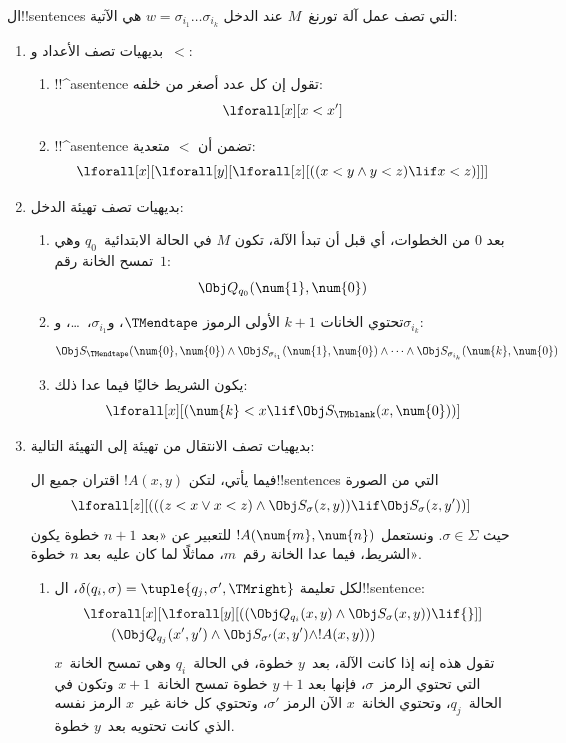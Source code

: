 \documentclass[../../../include/open-logic-section]{subfiles}
\begin{document}
ال!!{sentence}s التي تصف عمل آلة تورنغ~$M$ عند الدخل
$w=\sigma_{i_1}\dots\sigma_{i_k}$ هي الآتية:
\begin{enumerate}
\item بديهيات تصف الأعداد و~$<$:
\begin{enumerate}
\item !!^a{sentence} تقول إن كل عدد أصغر من خلفه:
\[
\lforall[x][x < x']
\]
\item !!^a{sentence} تضمن أن $<$ متعدية:
\[
\lforall[x][\lforall[y][\lforall[z][
      ((x < y \land y < z) \lif x < z)]]]
\]
\end{enumerate}
\item بديهيات تصف تهيئة الدخل:
\begin{enumerate}
\item بعد $0$ من الخطوات، أي قبل أن تبدأ الآلة، تكون $M$ في الحالة
  الابتدائية~$q_0$ وهي تمسح الخانة رقم~$1$:
\[
\Obj Q_{q_0}(\num{1},\num{0})
\]
\item تحتوي الخانات $k+1$ الأولى الرموز $\TMendtape$،
  و$\sigma_{i_1}$،~\dots، و$\sigma_{i_k}$:
\[
\Obj S_\TMendtape(\num{0}, \num{0}) \land
\Obj S_{\sigma_{i_1}}(\num{1}, \num{0}) \land
\dots \land
\Obj S_{\sigma_{i_k}}(\num{k}, \num{0})
\]
\item يكون الشريط خاليًا فيما عدا ذلك:
\[
\lforall[x][(\num{k} < x \lif \Obj S_\TMblank(x, \num{0}))]
\]
\end{enumerate}
\item بديهيات تصف الانتقال من تهيئة إلى التهيئة التالية:

فيما يأتي، لتكن $!A(x,y)$ اقتران جميع ال!!{sentence}s التي من الصورة
\[
\lforall[z][
  (((z < x \lor x < z) \land \Obj S_\sigma(z, y))
  \lif \Obj S_\sigma(z, y'))]
\]
حيث $\sigma\in\Sigma$. ونستعمل $!A(\num{m},\num{n})$ للتعبير عن
«بعد $n+1$ خطوة يكون الشريط، فيما عدا الخانة رقم~$m$، مماثلًا لما كان
عليه بعد $n$ خطوة».
\begin{enumerate}
\item {} لكل تعليمة
$\delta(q_i,\sigma)=\tuple{q_j,\sigma',\TMright}$، ال!!{sentence}:
\begin{align*}
& \lforall[x][\lforall[y][(
   (\Obj Q_{q_i}(x, y) \land \Obj S_{\sigma}(x, y)) \lif {}]] \\
&\qquad   (\Obj Q_{q_j}(x', y') \land \Obj S_{\sigma'}(x, y') \land
!A(x, y)))
\end{align*}
تقول هذه إنه إذا كانت الآلة، بعد~$y$ خطوة، في الحالة~$q_i$ وهي تمسح
الخانة~$x$ التي تحتوي الرمز~$\sigma$، فإنها بعد $y+1$ خطوة تمسح
الخانة~$x+1$ وتكون في الحالة~$q_j$، وتحتوي الخانة~$x$ الآن الرمز
$\sigma'$، وتحتوي كل خانة غير~$x$ الرمز نفسه الذي كانت تحتويه بعد~$y$
خطوة.


\end{enumerate}
\end{enumerate}
\end{document}
